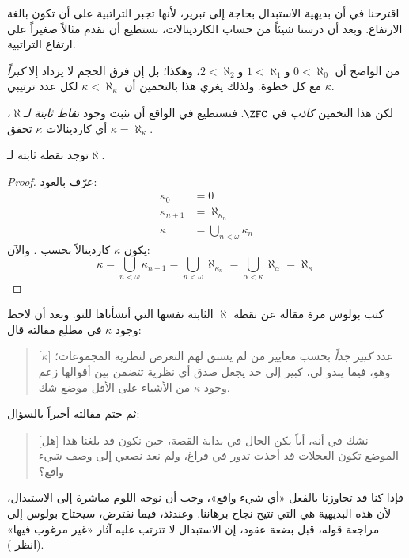 \documentclass[../../../include/open-logic-section]{subfiles}
\begin{document}

اقترحنا في  أن بديهية الاستبدال بحاجة إلى تبرير،
لأنها تجبر التراتبية على أن تكون بالغة الارتفاع. وبعد أن درسنا شيئاً من
حساب الكاردينالات، نستطيع أن نقدم مثالاً صغيراً على ارتفاع التراتبية.

من الواضح أن $0 < \aleph_0$ و$1 < \aleph_1$ و$2 < \aleph_2$، وهكذا؛
بل إن فرق الحجم لا يزداد إلا \emph{كبراً} مع كل خطوة. ولذلك يغري هذا
بالتخمين أن $\kappa< \aleph_\kappa$ لكل عدد ترتيبي $\kappa$.

لكن هذا التخمين \emph{كاذب} في $\ZFC$. فنستطيع في الواقع أن نثبت وجود
\emph{نقاط ثابتة لـ$\aleph$}، أي كاردينالات $\kappa$ تحقق
$\kappa=\aleph_\kappa$.

\begin{prop}
توجد نقطة ثابتة لـ$\aleph$.
\end{prop}

\begin{proof}
عرّف بالعود:
\begin{align*}
	\kappa_0 &= 0\\
	\kappa_{n+1} &= \aleph_{\kappa_n}\\
	\kappa&= \bigcup_{n < \omega}\kappa_n
\end{align*}
يكون $\kappa$ كاردينالاً بحسب
. والآن:
\[
	\kappa= \bigcup_{n < \omega} \kappa_{n+1} =
	\bigcup_{n < \omega}\aleph_{\kappa_n} =
	\bigcup_{\alpha < \kappa}\aleph_\alpha = \aleph_\kappa
\]
\end{proof}

كتب بولوس مرة مقالة عن نقطة $\aleph$ الثابتة نفسها التي أنشأناها للتو.
وبعد أن لاحظ وجود $\kappa$ في مطلع مقالته قال:
\begin{quote}
	[$\kappa$] عدد \emph{كبير جداً} بحسب معايير من لم يسبق لهم التعرض
	لنظرية المجموعات؛ وهو، فيما يبدو لي، كبير إلى حد يجعل صدق أي نظرية
	تتضمن بين أقوالها زعم وجود $\kappa$ من الأشياء على الأقل موضع شك.
	\citep[p.~257]{Boolos2000}
\end{quote}
ثم ختم مقالته أخيراً بالسؤال:
\begin{quote}
	[هل] نشك في أنه، أياً يكن الحال في بداية القصة، حين نكون قد بلغنا هذا
	الموضع تكون العجلات قد أخذت تدور في فراغ، ولم نعد نصغي إلى وصف شيء
	واقع؟
	\citep[p.~268]{Boolos2000}
\end{quote}
فإذا كنا قد تجاوزنا بالفعل «أي شيء واقع»، وجب أن نوجه اللوم مباشرة إلى
الاستبدال، لأن هذه البديهية هي التي تتيح نجاح برهاننا. وعندئذ، فيما
نفترض، سيحتاج بولوس إلى مراجعة قوله، قبل بضعة عقود، إن الاستبدال لا تترتب
عليه آثار «غير مرغوب فيها» (انظر
).
\end{document}
